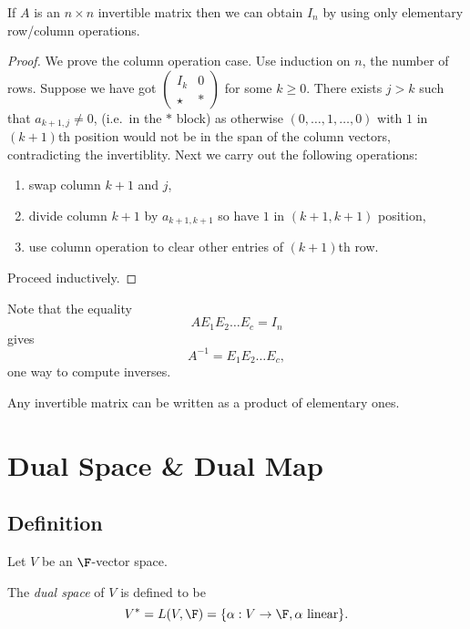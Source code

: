 \documentclass[a4paper]{article}
\theoremstyle{definition}
\begin{document}
\begin{lemma}
  If \(A\) is an \(n\times n\) invertible matrix then we can obtain \(I_n\) by using only elementary row/column operations.
\end{lemma}

\begin{proof}
  We prove the column operation case. Use induction on \(n\), the number of rows. Suppose we have got \(\begin{pmatrix} I_k & 0 \\ \star & \ast \end{pmatrix}\) for some \(k\geq 0\). There exists \(j>k\) such that \(a_{k+1,j}\neq 0\), (i.e.\ in the \(\ast\) block) as otherwise \((0,\dots,1,\dots, 0)\) with \(1\) in \((k+1)\)th position would not be in the span of the column vectors, contradicting the invertiblity. Next we carry out the following operations:
  \begin{enumerate}
  \item swap column \(k+1\) and \(j\),
  \item divide column \(k+1\) by \(a_{k + 1, k + 1}\) so have \(1\) in \((k+1,k+1)\) position,
  \item use column operation to clear other entries of \((k+1)\)th row.
  \end{enumerate}
  Proceed inductively.
\end{proof}

Note that the equality
\[
  AE_1E_2\dots E_c = I_n
\]
gives
\[
  A^{-1} = E_1E_2\dots E_c,
\]
one way to compute inverses.

\begin{proposition}
  Any invertible matrix can be written as a product of elementary ones.
\end{proposition}

\section{Dual Space \& Dual Map}

\subsection{Definition}

Let \(V\) be an \(\F\)-vector space.

\begin{definition}
  The \emph{dual space} of \(V\) is defined to be
  \[
    V^* = L(V,\F) = \{\alpha:V\to \F, \alpha \text{ linear}\}.
  \]
\end{definition}
\end{document}
